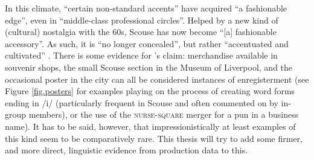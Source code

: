 In this climate, ``certain non-standard accents'' have acquired ``a fashionable edge'', even in ``middle-class professional circles''.
Helped by a new kind of (cultural) nostalgia with the 60s, Scouse has now become ``[a] fashionable accessory''.
As such, it is ``no longer concealed'', but rather ``accentuated and cultivated'' \citep[58]{belchem2006d}.
There is some evidence for \citeauthor{belchem2006d}'s claim: merchandise available in souvenir shops, the small Scouse section in the Museum of Liverpool, and the occasional poster in the city can all be considered instances of enregisterment (see Figure \ref{fig.posters} for examples playing on the process of creating word forms ending in /i/ (particularly frequent in Scouse and often commented on by in-group members), or the use of the \textsc{nurse}-\textsc{square} merger for a pun in a business name).
It has to be said, however, that impressionistically at least examples of this kind seem to be comparatively rare.
This thesis will try to add some firmer, and more direct, linguistic evidence from production data to this.

